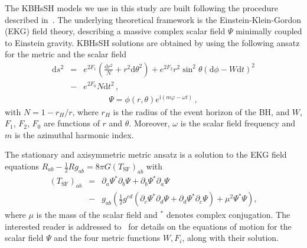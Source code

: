 \documentclass[twocolumn,aps,showpacs,showkeys,prd,superscriptaddress,byrevtex, amsmath]{revtex4-1}
\begin{document}
The KBHsSH models we use in this study are built following the procedure described in~\cite{Herdeiro:2015b}. The underlying theoretical framework is the Einstein-Klein-Gordon (EKG) field theory, describing a massive complex scalar field $\Psi$ minimally coupled to Einstein gravity. KBHsSH solutions are obtained by using the following ansatz for the metric and the scalar field~\cite{Herdeiro:2014a}
\begin{eqnarray}
\mathrm{d}s^2 &=& e^{2F_1}\left(\frac{\mathrm{d}r^2}{N} + r^2\mathrm{d}\theta^2\right) +  e^{2F_2}r^2\sin^2 \theta(\mathrm{d}\phi-W\mathrm{d}t)^2 
\nonumber \\ 
&-&  e^{2F_0}N\mathrm{d}t^2\,,
\label{metric}
\end{eqnarray}
\begin{eqnarray}
\Psi = \phi(r, \theta) e^{\mathrm{i}(m\varphi - \omega t)} \,,
\end{eqnarray}
with $N = 1 - r_H/r$, where $r_H$ is the radius of the event horizon of the BH, and $W$, $F_1$, $F_2$, $F_0$ are functions of $r$ and $\theta$. Moreover, $\omega$ is the scalar field frequency and $m$ is the azimuthal harmonic index.

The stationary and axisymmetric metric ansatz is a solution to the EKG field equations $R_{ab} - \frac{1}{2}R g _{ab} = 8 \pi G (T_{\mathrm{SF}})_{ab}$ with 
\begin{eqnarray}\label{eq:e-m_scalaf_field}
(T_{\mathrm{SF}})_{ab} &=& \partial_a \Psi^* \partial_b \Psi + \partial_b \Psi^* \partial_a \Psi 
\nonumber \\ 
&-& g_{ab} \left(\frac{1}{2} g^{cd}(\partial_c \Psi^* \partial_d \Psi + \partial_d \Psi^* \partial_c \Psi) + \mu^2 \Psi^* \Psi \right),
\end{eqnarray}
where $\mu$ is the mass of the scalar field and $^*$ denotes complex conjugation. The interested reader is addressed to~\cite{Herdeiro:2015b} for details on the equations of motion for the scalar field $\Psi$ and the four metric functions ${W, F_i}$, along with their solution.
\end{document}
